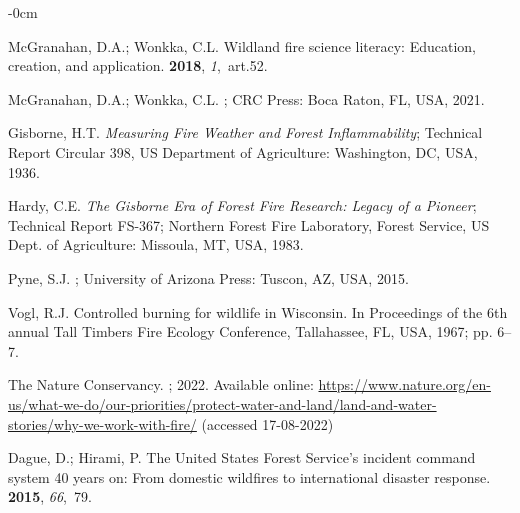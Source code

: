 \documentclass[fire,casereport,accept,moreauthors,pdftex]{Definitions/mdpi}  %
\begin{document}
\begin{adjustwidth}{-\extralength}{0cm}

\begin{thebibliography}{999}

McGranahan, D.A.; Wonkka, C.L.
\newblock Wildland fire science literacy: Education, creation, and application.
 {\bf 2018}, {\em 1},~art.52. %

McGranahan, D.A.; Wonkka, C.L.
; CRC Press: {Boca Raton, FL, USA,} %
  2021.

Gisborne, H.T.
\newblock \emph{Measuring Fire Weather and Forest Inflammability};
\newblock Technical Report Circular 398, US Department of Agriculture:
  Washington, DC, USA, 1936.

Hardy, C.E.
\newblock \emph{The Gisborne Era of Forest Fire Research: Legacy of a Pioneer};
\newblock Technical Report FS-367; Northern Forest Fire Laboratory, Forest
  Service, US Dept. of Agriculture: Missoula, MT, USA,  1983.

Pyne, S.J.
;
  {University of Arizona Press}: Tuscon, AZ, USA,  2015. %

Vogl, R.J.
\newblock Controlled burning for wildlife in Wisconsin.
\newblock In Proceedings of the  6th annual Tall Timbers Fire
  Ecology Conference,  Tallahassee, FL, USA, 1967; pp. 6--7. %

{The Nature Conservancy}.
; 2022. Available online:
  \url{https://www.nature.org/en-us/what-we-do/our-priorities/protect-water-and-land/land-and-water-stories/why-we-work-with-fire/}  (accessed 17-08-2022)
   

Dague, D.; Hirami, P.
\newblock The United States Forest Service's incident command system 40 years
  on: From domestic wildfires to international disaster response.
 {\bf 2015}, {\em 66},~79.


\end{thebibliography}
\end{adjustwidth}
\end{document}
